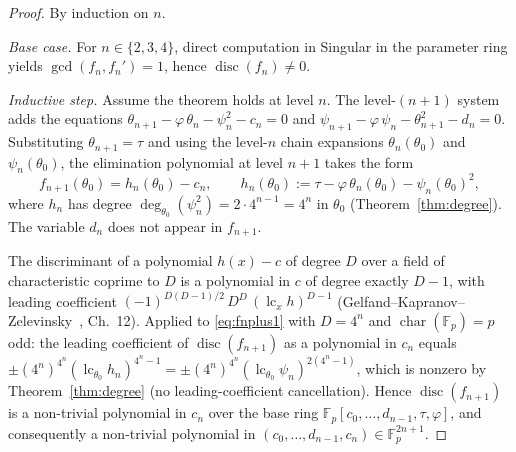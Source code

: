 \documentclass[11pt,a4paper]{article}
\theoremstyle{definition}
\newcommand{\Fp}{\mathbb{F}_p}
\begin{document}
\begin{proof}
By induction on $n$.

\emph{Base case.} For $n\in\{2,3,4\}$, direct computation in Singular
in the parameter ring yields $\gcd(f_n,f_n') = 1$, hence
$\operatorname{disc}(f_n)\ne 0$.

\emph{Inductive step.} Assume the theorem holds at level $n$. The
level-$(n+1)$ system adds the equations
$\theta_{n+1} - \varphi\,\theta_n - \psi_n^2 - c_n = 0$ and
$\psi_{n+1} - \varphi\,\psi_n - \theta_{n+1}^2 - d_n = 0$. Substituting
$\theta_{n+1} = \tau$ and using the level-$n$ chain expansions
$\theta_n(\theta_0)$ and $\psi_n(\theta_0)$, the elimination polynomial
at level $n+1$ takes the form
\begin{equation}\label{eq:fnplus1}
  f_{n+1}(\theta_0) = h_n(\theta_0) - c_n,
  \qquad
  h_n(\theta_0) := \tau - \varphi\,\theta_n(\theta_0) - \psi_n(\theta_0)^2,
\end{equation}
where $h_n$ has degree $\deg_{\theta_0}(\psi_n^2) = 2\cdot 4^{n-1} = 4^{n}$
in $\theta_0$ (Theorem~\ref{thm:degree}). The variable $d_n$ does not
appear in $f_{n+1}$.

The discriminant of a polynomial $h(x) - c$ of degree $D$ over a field
of characteristic coprime to $D$ is a polynomial in $c$ of degree
exactly $D - 1$, with leading coefficient
$(-1)^{D(D-1)/2}\,D^D\,(\operatorname{lc}_{x}h)^{D-1}$
(Gelfand--Kapranov--Zelevinsky~\cite{GKZ1994}, Ch.~12). Applied to
\eqref{eq:fnplus1} with $D = 4^{n}$ and $\operatorname{char}(\Fp) = p$
odd: the leading coefficient of $\operatorname{disc}(f_{n+1})$ as a
polynomial in $c_n$ equals
$\pm (4^n)^{4^n}(\operatorname{lc}_{\theta_0}h_n)^{4^n-1}
= \pm (4^n)^{4^n}(\operatorname{lc}_{\theta_0}\psi_n)^{2(4^n-1)}$,
which is nonzero by Theorem~\ref{thm:degree} (no leading-coefficient
cancellation). Hence $\operatorname{disc}(f_{n+1})$ is a non-trivial
polynomial in $c_n$ over the base ring
$\Fp[c_0,\dots,d_{n-1},\tau,\varphi]$, and consequently a non-trivial
polynomial in $(c_0,\dots,d_{n-1},c_n) \in \Fp^{2n+1}$.
\end{proof}
\end{document}
